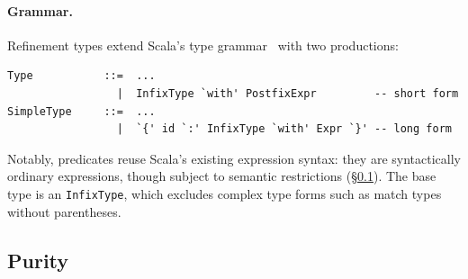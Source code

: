\documentclass[acmsmall]{acmart}
\begin{document}
\paragraph{Grammar.} Refinement types extend Scala's type grammar~\cite[\S13]{scala3spec} with two productions:
%
\begin{lstlisting}[morecomment={[l]{--}},commentstyle=\color{gray}\itshape]
Type           ::=  ...
                 |  InfixType `with' PostfixExpr         -- short form
SimpleType     ::=  ...
                 |  `{' id `:' InfixType `with' Expr `}' -- long form
\end{lstlisting}
%

Notably, predicates reuse Scala's existing expression syntax: they are syntactically ordinary expressions, though subject to semantic restrictions (\S\ref{sec:predicates}). The base type is an \lstinline!InfixType!, which excludes complex type forms such as match types without parentheses.


\subsection{Purity}\label{sec:predicates}\label{sec:purity}
\end{document}
